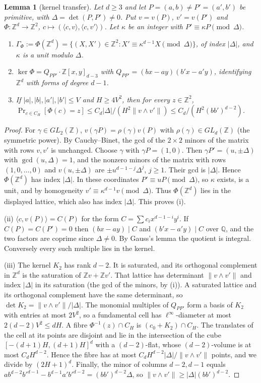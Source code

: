 \documentclass[11pt]{amsart}
\newtheorem{lemma}[theorem]{Lemma}
\theoremstyle{definition}
\newcommand{\Z}{\mathbb{Z}}
\newcommand{\Q}{\mathbb{Q}}
\newcommand{\Prob}{\Pr}
\begin{document}
\begin{lemma}[kernel transfer]\label{lem:kern}
Let $d\ge3$ and let $P=(a,b)\ne P'=(a',b')$ be primitive, with $\Delta=\det(P,P')\ne0$. Put $v=v(P)$, $v'=v(P')$ and
$\Phi:\Z^d\to\Z^2$, $c\mapsto(\langle c,v\rangle,\langle c,v'\rangle)$. Let $\kappa$ be an integer with $P'\equiv\kappa P\pmod\Delta$.
\begin{enumerate}[label=(\roman*)]
\item $\Gamma_\Phi:=\Phi(\Z^d)=\{(X,X')\in\Z^2:X'\equiv\kappa^{d-1}X\pmod{\Delta}\}$, of index $|\Delta|$, and $\kappa$ is a unit modulo $\Delta$.
\item $\ker\Phi=Q_{PP'}\cdot\Z[x,y]_{d-3}$ with $Q_{PP'}=(bx-ay)(b'x-a'y)$, identifying $\Z^d$ with forms of degree $d-1$.
\item If $|a|,|b|,|a'|,|b'|\le V$ and $H\ge4V^2$, then for every $z\in\Z^2$,
  $\Prob_{c\in C_H}[\Phi(c)=z]\le C_d|\Delta|/(H^2\|v\wedge v'\|)\le C_d/(H^2(bb')^{d-2})$.
\end{enumerate}
\end{lemma}

\begin{proof}
For $\gamma\in GL_2(\Z)$, $v(\gamma P)=\rho(\gamma)v(P)$ with $\rho(\gamma)\in GL_d(\Z)$ (the symmetric power). By Cauchy--Binet, the gcd of
the $2\times2$ minors of the matrix with rows $v,v'$ is unchanged. Choose $\gamma$ with $\gamma P=(1,0)$. Then $\gamma P'=(u,\pm\Delta)$ with
$\gcd(u,\Delta)=1$, and the nonzero minors of the matrix with rows $(1,0,\dots,0)$ and $v(u,\pm\Delta)$ are $\pm u^{d-1-j}\Delta^j$, $j\ge1$.
Their gcd is $|\Delta|$. Hence $\Phi(\Z^d)$ has index $|\Delta|$. In these coordinates $P'\equiv uP\pmod\Delta$, so $\kappa$ exists, is a
unit, and by homogeneity $v'\equiv\kappa^{d-1}v\pmod\Delta$. Thus $\Phi(\Z^d)$ lies in the displayed lattice, which also has
index $|\Delta|$. This proves (i).

(ii) $\langle c,v(P)\rangle=C(P)$ for the form $C=\sum c_ix^{d-1-i}y^i$. If $C(P)=C(P')=0$ then $(bx-ay)\mid C$ and $(b'x-a'y)\mid C$ over $\Q$, and the two factors are coprime
since $\Delta\ne0$. By Gauss's lemma the quotient is integral. Conversely every such multiple lies in the kernel.

(iii) The kernel $K_2$ has rank $d-2$. It is saturated, and its orthogonal complement in $\Z^d$ is the saturation of
$\Z v+\Z v'$. That lattice has determinant $\|v\wedge v'\|$ and index $|\Delta|$ in its saturation (the gcd of the minors, by (i)). A saturated
lattice and its orthogonal complement have the same determinant, so $\det K_2=\|v\wedge v'\|/|\Delta|$. The monomial
multiples of $Q_{PP'}$ form a basis of $K_2$ with entries at most $2V^2$, so a fundamental cell has $\ell^\infty$-diameter at most
$2(d-2)V^2\le dH$. A fibre $\Phi^{-1}(z)\cap C_H$ is $(c_0+K_2)\cap C_H$. The translates of the cell at its points are disjoint
and lie in the intersection of the cube $[-(d+1)H,(d+1)H]^d$ with a $(d-2)$-flat, whose $(d-2)$-volume is at most
$C_dH^{d-2}$. Hence the fibre has at most $C_dH^{d-2}|\Delta|/\|v\wedge v'\|$ points, and we divide by $(2H+1)^d$. Finally, the minor of
columns $d-2,d-1$ equals $ab^{d-2}b'^{d-1}-b^{d-1}a'b'^{d-2}=(bb')^{d-2}\Delta$, so $\|v\wedge v'\|\ge|\Delta|(bb')^{d-2}$.
\end{proof}
\end{document}
